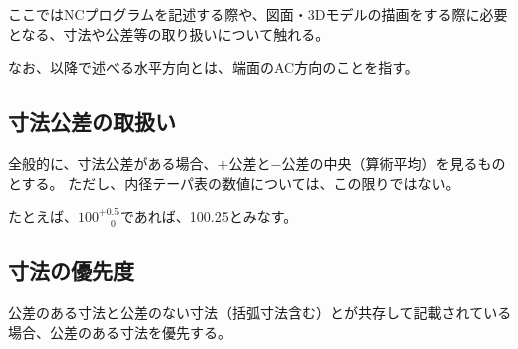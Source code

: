 

ここではNCプログラムを記述する際や、図面・3Dモデルの描画をする際に必要となる、寸法や公差等の取り扱いについて触れる。

なお、以降で述べる水平方向とは、端面のAC方向のことを指す。





\subsection{寸法公差の取扱い}
全般的に、寸法公差がある場合、$+$公差と$-$公差の中央（算術平均）を見るものとする。
ただし、内径テーパ表の数値については、この限りではない。
\begin{hosoku}
たとえば、$100^{+0.5}_{\phantom -0}$であれば、100.25とみなす。
\end{hosoku}


\subsection{寸法の優先度}
公差のある寸法と公差のない寸法（括弧寸法含む）とが共存して記載されている場合、公差のある寸法を優先する。

